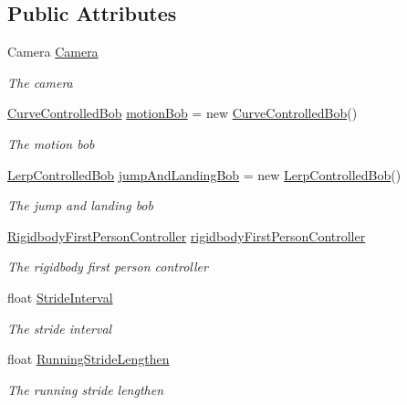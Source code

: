 \subsection*{Public Attributes}
\begin{DoxyCompactItemize}
\item 
Camera \hyperlink{class_lerp2_assets_1_1_characters_1_1_first_person_1_1_head_bob_af65553a9381abf7edd56d3d2a73c91e0}{Camera}
\begin{DoxyCompactList}\small\item\em The camera \end{DoxyCompactList}\item 
\hyperlink{class_lerp2_assets_1_1_utility_1_1_curve_controlled_bob}{Curve\+Controlled\+Bob} \hyperlink{class_lerp2_assets_1_1_characters_1_1_first_person_1_1_head_bob_a04ecaf3e0c27c3dc16735db4dd2dd864}{motion\+Bob} = new \hyperlink{class_lerp2_assets_1_1_utility_1_1_curve_controlled_bob}{Curve\+Controlled\+Bob}()
\begin{DoxyCompactList}\small\item\em The motion bob \end{DoxyCompactList}\item 
\hyperlink{class_lerp2_assets_1_1_utility_1_1_lerp_controlled_bob}{Lerp\+Controlled\+Bob} \hyperlink{class_lerp2_assets_1_1_characters_1_1_first_person_1_1_head_bob_a80e90ab8e38ab33fef9caad63a8f8c83}{jump\+And\+Landing\+Bob} = new \hyperlink{class_lerp2_assets_1_1_utility_1_1_lerp_controlled_bob}{Lerp\+Controlled\+Bob}()
\begin{DoxyCompactList}\small\item\em The jump and landing bob \end{DoxyCompactList}\item 
\hyperlink{class_lerp2_assets_1_1_characters_1_1_first_person_1_1_rigidbody_first_person_controller}{Rigidbody\+First\+Person\+Controller} \hyperlink{class_lerp2_assets_1_1_characters_1_1_first_person_1_1_head_bob_a5f5bc92b73ac0b0cb3de7068ec03918b}{rigidbody\+First\+Person\+Controller}
\begin{DoxyCompactList}\small\item\em The rigidbody first person controller \end{DoxyCompactList}\item 
float \hyperlink{class_lerp2_assets_1_1_characters_1_1_first_person_1_1_head_bob_a56b68c4aa608ba9b498436770c2aa552}{Stride\+Interval}
\begin{DoxyCompactList}\small\item\em The stride interval \end{DoxyCompactList}\item 
float \hyperlink{class_lerp2_assets_1_1_characters_1_1_first_person_1_1_head_bob_a34bcdd9a3b151854a271031395a76d87}{Running\+Stride\+Lengthen}
\begin{DoxyCompactList}\small\item\em The running stride lengthen \end{DoxyCompactList}\end{DoxyCompactItemize}


